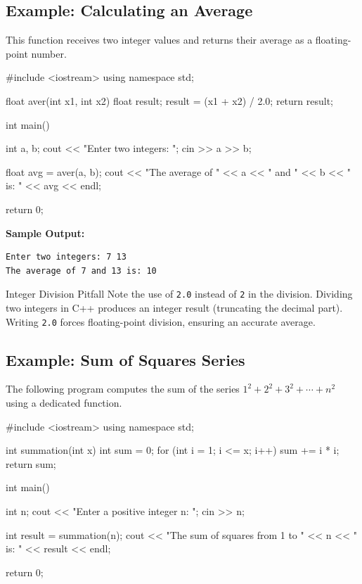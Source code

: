 \subsection{Example: Calculating an Average}

This function receives two integer values and returns their average as a
floating-point number.

\begin{cppcode}
#include <iostream>
using namespace std;

float aver(int x1, int x2)
{
    float result;
    result = (x1 + x2) / 2.0;
    return result;
}

int main()
{
    int a, b;
    cout << "Enter two integers: ";
    cin >> a >> b;

    float avg = aver(a, b);
    cout << "The average of " << a << " and " << b
         << " is: " << avg << endl;

    return 0;
}
\end{cppcode}

\noindent\textbf{Sample Output:}
\begin{verbatim}
Enter two integers: 7 13
The average of 7 and 13 is: 10
\end{verbatim}

\begin{warningbox}{Integer Division Pitfall}
Note the use of \texttt{2.0} instead of \texttt{2} in the division. Dividing
two integers in C++ produces an integer result (truncating the decimal part).
Writing \texttt{2.0} forces floating-point division, ensuring an accurate
average.
\end{warningbox}

\subsection{Example: Sum of Squares Series}

The following program computes the sum of the series
$1^{2} + 2^{2} + 3^{2} + \cdots + n^{2}$ using a dedicated function.

\begin{cppcode}
#include <iostream>
using namespace std;

int summation(int x)
{
    int sum = 0;
    for (int i = 1; i <= x; i++)
    {
        sum += i * i;
    }
    return sum;
}

int main()
{
    int n;
    cout << "Enter a positive integer n: ";
    cin >> n;

    int result = summation(n);
    cout << "The sum of squares from 1 to " << n
         << " is: " << result << endl;

    return 0;
}
\end{cppcode}

